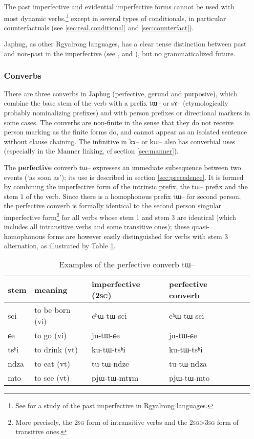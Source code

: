 \documentclass[oldfontcommands,oneside,a4paper,11pt]{article}
\newcommand{\ipa}[1]{{\phon \mbox{#1}}} %
\begin{document}
The past imperfective  and   evidential imperfective forms cannot be used with most dynamic verbs,\footnote{ See \citealt{lin11direction} for a study of the past imperfective in Rgyalrong languages. } except in    several types of conditionals, in particular counterfactuals (see \ref{sec:real.conditional} and \ref{sec:counterfact}). 
  
 Japhug, as other Rgyalrong languages, has a clear tense distinction between past and non-past in the imperfective (see \citealt{jackson00puxi}, \citealt{linyj03tense} and \citealt[371-392]{jacques04these}), but no grammaticalized future. 
  
\subsubsection{Converbs} \label{sec:converbs}
 There are three converbs in Japhug (perfective, gerund and purposive), which combine the base stem of the verb with a  prefix \ipa{tɯ--} or \ipa{sɤ--} (etymologically probably nominalizing prefixes) and with person prefixes or directional markers in some cases. The converbs are non-finite in the sense that they do not receive person marking as the finite forms do, and cannot appear as an isolated sentence without clause chaining. The infinitive in \ipa{kɤ--} or \ipa{kɯ--} also has converbial uses (especially in the Manner linking, cf section \ref{sec:manner}).
 
 
The \textbf{perfective} converb \ipa{tɯ}-- expresses an immediate subsequence between two events (`as soon as'); its use is described in section \ref{sec:precedence}. It is formed by combining the  imperfective form of the intrinsic prefix, the \ipa{tɯ}-- prefix and the stem 1 of the verb. Since there is a homophonous prefix \ipa{tɯ}-- for second person, the perfective converb is formally identical to the second person singular imperfective form\footnote{More precisely, the \textsc{2sg} form of intransitive verbs and the \textsc{2sg>3sg} form of transitive ones. } for all verbs whose stem 1 and stem 3 are identical (which includes all intransitive verbs and some transitive ones); these quasi-homophonous forms are however easily distinguished for verbs with stem 3 alternation, as illustrated by  Table  \ref{tab:pfv.converb}.

\begin{table}[h]
\caption{Examples of the perfective converb \ipa{tɯ}--} \label{tab:pfv.converb}
\begin{tabular}{lllll}
\toprule
stem & meaning &imperfective (\textsc{2sg}) & perfective converb \\
\midrule
\ipa{sci} & to be born (vi) & \ipa{cʰɯ-tɯ-sci} &  \ipa{cʰɯ-tɯ-sci}\\
\ipa{ɕe} & to go (vi) & \ipa{ju-tɯ-ɕe} & \ipa{ju-tɯ-ɕe} \\
\ipa{tsʰi} & to drink (vt) & \ipa{ku-tɯ-tsʰi} & \ipa{ku-tɯ-tsʰi}  \\
\midrule
\ipa{ndza} & to eat (vt) & \ipa{tu-tɯ-ndze} &  \ipa{tu-tɯ-ndza}\\
\ipa{mto} & to see (vt)& \ipa{pjɯ-tɯ-mtɤm} &  \ipa{pjɯ-tɯ-mto}\\
\bottomrule
\end{tabular}
\end{table}
\end{document}
